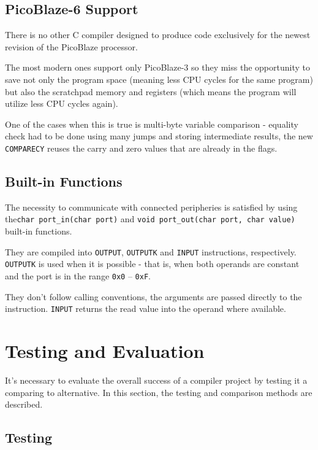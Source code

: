     \section{PicoBlaze-6 Support}

    There is no other C compiler designed to produce code exclusively for the newest revision of the PicoBlaze processor.

    The most modern ones support only PicoBlaze-3 so they miss the opportunity to save not only the program space (meaning less CPU cycles for the same program) but also the scratchpad memory and registers (which means the program will utilize less CPU cycles again).

    One of the cases when this is true is multi-byte variable comparison - equality check had to be done using many jumps and storing intermediate results, the new \texttt{COMPARECY} reuses the carry and zero values that are already in the flags.

    \section{Built-in Functions}

    The necessity to communicate with connected peripheries is satisfied by using the\texttt{char port\_in(char port)} and \texttt{void port\_out(char port, char value)} built-in functions.

    They are compiled into \texttt{OUTPUT}, \texttt{OUTPUTK} and \texttt{INPUT} instructions, respectively. \texttt{OUTPUTK} is used when it is possible - that is, when both operands are constant and the port is in the range \texttt{0x0} -- \texttt{0xF}.

    They don't follow calling conventions, the arguments are passed directly to the instruction. \texttt{INPUT} returns the read value into the operand where available.

    


\chapter{Testing and Evaluation}\label{evaluation}

It's necessary to evaluate the overall success of a compiler project by testing it a comparing to alternative. In this section, the testing and comparison methods are described.

    \section{Testing}\label{testing}
 

